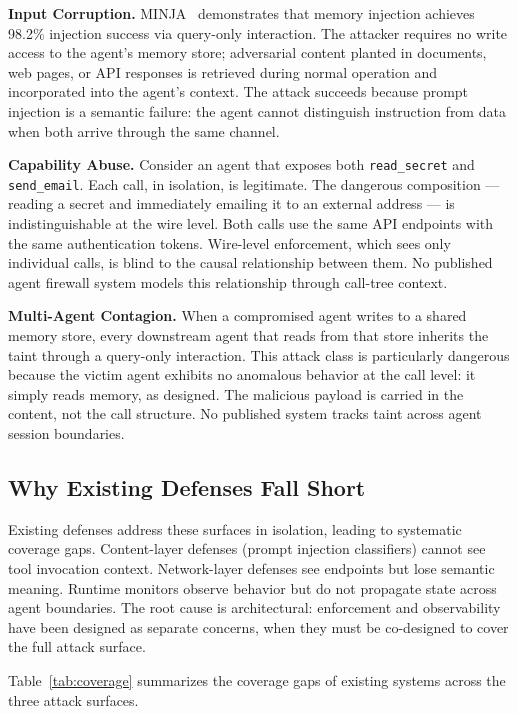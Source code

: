 \documentclass[conference]{IEEEtran}
\begin{document}
\textbf{Input Corruption.}
MINJA~\cite{minja2025} demonstrates that memory injection achieves
98.2\% injection success via query-only interaction. The attacker requires
no write access to the agent's memory store; adversarial content planted
in documents, web pages, or API responses is retrieved during normal
operation and incorporated into the agent's context. The attack succeeds
because prompt injection is a semantic failure: the agent cannot
distinguish instruction from data when both arrive through the same
channel.

\textbf{Capability Abuse.}
Consider an agent that exposes both \texttt{read\_secret} and
\texttt{send\_email}. Each call, in isolation, is legitimate. The
dangerous composition --- reading a secret and immediately emailing it to
an external address --- is indistinguishable at the wire level. Both calls
use the same API endpoints with the same authentication tokens. Wire-level
enforcement, which sees only individual calls, is blind to the causal
relationship between them. No published agent firewall system models this
relationship through call-tree context.

\textbf{Multi-Agent Contagion.}
When a compromised agent writes to a shared memory store, every downstream
agent that reads from that store inherits the taint through a query-only
interaction. This attack class is particularly dangerous because the victim
agent exhibits no anomalous behavior at the call level: it simply reads
memory, as designed. The malicious payload is carried in the content, not
the call structure. No published system tracks taint across agent session
boundaries.

\subsection{Why Existing Defenses Fall Short}

Existing defenses address these surfaces in isolation, leading to
systematic coverage gaps. Content-layer defenses (prompt injection
classifiers) cannot see tool invocation context. Network-layer defenses
see endpoints but lose semantic meaning. Runtime monitors observe behavior
but do not propagate state across agent boundaries. The root cause is
architectural: enforcement and observability have been designed as separate
concerns, when they must be co-designed to cover the full attack surface.

Table~\ref{tab:coverage} summarizes the coverage gaps of existing systems
across the three attack surfaces.
\end{document}
